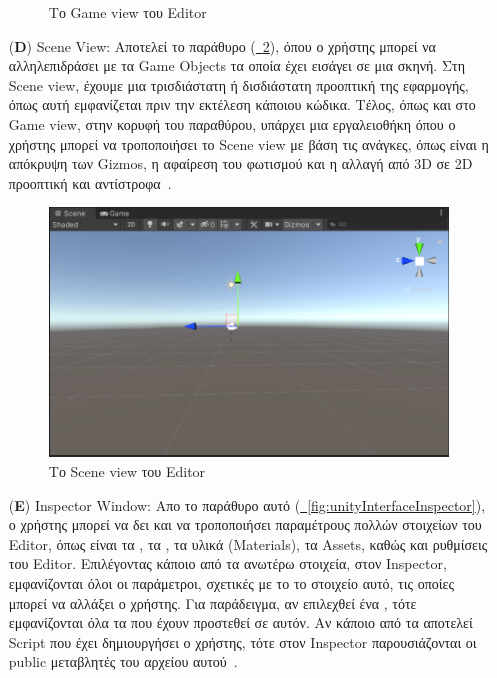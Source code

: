 \begin{itemize}
\begin{figure}[!ht]
        \caption{Το Game view του Editor}\label{fig:unityInterfaceGameView}
    \end{figure}
    \item[(\textbf{D})] Scene View: Αποτελεί το παράθυρο (\hyperref[fig:unityInterfaceSceneView]{\schema~\ref*{fig:unityInterfaceSceneView}}), όπου ο χρήστης μπορεί να αλληλεπιδράσει με τα Game Objects τα οποία έχει εισάγει σε μια σκηνή. Στη Scene view, έχουμε μια τρισδιάστατη ή δισδιάστατη προοπτική της εφαρμογής, όπως αυτή εμφανίζεται πριν την εκτέλεση κάποιου κώδικα. Τέλος, όπως και στο Game view, στην κορυφή του παραθύρου, υπάρχει μια εργαλειοθήκη όπου ο χρήστης μπορεί να τροποποιήσει το Scene view με βάση τις ανάγκες, όπως είναι η απόκρυψη των Gizmos, η αφαίρεση του φωτισμού και η αλλαγή από 3D σε 2D προοπτική και αντίστροφα~\cite{unitytechnologies_2023_scene}.
    \begin{figure}[!hb]
        \centering
        \includegraphics[width=1\linewidth]{images/unity_interface_scene_view.png}
        \caption{Το Scene view του Editor}\label{fig:unityInterfaceSceneView}
    \end{figure}
    \item[(\textbf{E})] Inspector Window: Απο το παράθυρο αυτό (\hyperref[fig:unityInterfaceInspector]{\schema~\ref*{fig:unityInterfaceInspector}}), ο χρήστης μπορεί να δει και να τροποποιήσει παραμέτρους πολλών στοιχείων του Editor, όπως είναι τα , τα , τα υλικά (Materials), τα Assets, καθώς και ρυθμίσεις του Editor. Επιλέγοντας κάποιο από τα ανωτέρω στοιχεία, στον Inspector, εμφανίζονται όλοι οι παράμετροι, σχετικές με το το στοιχείο αυτό, τις οποίες μπορεί να αλλάξει ο χρήστης. Για παράδειγμα, αν επιλεχθεί ένα , τότε εμφανίζονται όλα τα  που έχουν προστεθεί σε αυτόν. Αν κάποιο από τα  αποτελεί Script που έχει δημιουργήσει ο χρήστης, τότε στον Inspector παρουσιάζονται οι public μεταβλητές του αρχείου αυτού~\cite{unitytechnologies_2023_inspector}.

\end{itemize}
